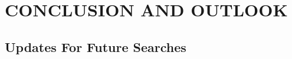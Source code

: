 %
%
%



\chapter{\texorpdfstring{\uppercase {Conclusion and Outlook}}{Conclusion and Outlook}}
\label{ch:conclusion}

\section{Updates For Future Searches}